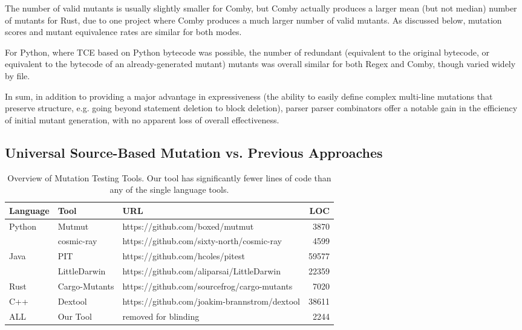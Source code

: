 \documentclass[sigconf,review, anonymous]{acmart}
\begin{document}
The number of valid mutants is usually
slightly smaller for Comby, but Comby actually produces a larger mean
(but not median) number of mutants for Rust, due to one project where
Comby produces a much larger number of valid mutants.  As discussed 
below, mutation scores and mutant equivalence rates are similar for
both modes.

For Python, where TCE based on Python bytecode was possible, the
number of redundant (equivalent to the original bytecode, or
equivalent to the bytecode of an already-generated mutant) mutants was
overall similar for both Regex and Comby, though varied widely by file.

In sum, in addition to providing a major advantage in expressiveness
(the ability to easily define complex multi-line mutations that
preserve structure, e.g. going beyond statement deletion to block
deletion), parser parser combinators offer a notable gain in the
efficiency of initial mutant generation, with no apparent loss of overall effectiveness.

\subsection{Universal Source-Based Mutation vs. Previous Approaches}

\begin{table*}[hbtp]
    \centering
    \caption{Overview of Mutation Testing Tools. Our tool has significantly fewer lines of code than any of the single language tools.}
    \label{tab:mutationtools}
    
    \begin{tabular}{|l|l|l|r|}
    \hline
    \textbf{Language} & \textbf{Tool} & \textbf{URL} & \textbf{LOC}  \\
    \hline
    \multirow{2}{*}{Python}  & Mutmut & https://github.com/boxed/mutmut & 3870  \\\cline{2-4}
        & cosmic-ray & https://github.com/sixty-north/cosmic-ray & 4599 \\ \hline
    \multirow{2}{*}{Java}  & PIT & https://github.com/hcoles/pitest & 59577  \\\cline{2-4}
        & LittleDarwin & https://github.com/aliparsai/LittleDarwin & 22359 \\ \hline
        Rust & Cargo-Mutants & https://github.com/sourcefrog/cargo-mutants & 7020 \\\hline
        C++ & Dextool & https://github.com/joakim-brannstrom/dextool & 38611 \\\hline
        ALL & Our Tool & removed for blinding & 2244 \\\hline
    \end{tabular}
    \end{table*}
    
\end{document}
